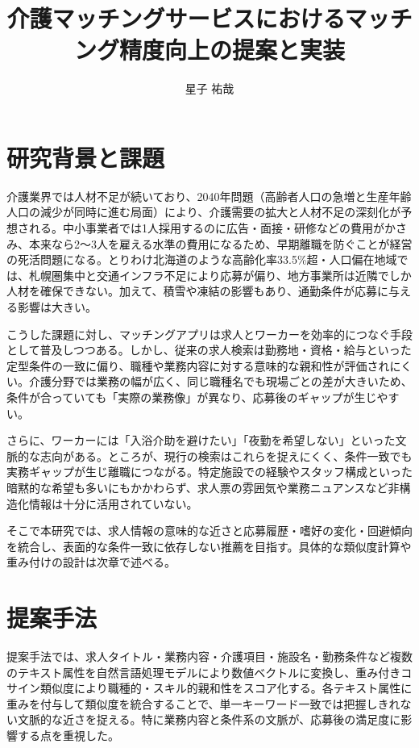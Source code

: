\documentclass[twocolumn,a4j,dvipdfmx]{jsarticle_customized1}
\title{介護マッチングサービスにおけるマッチング精度向上の提案と実装}
\author{星子 祐哉}
\date{}
\begin{document}
\twocolumn[\maketitle\vspace{0.0zw}]
\setlength{\baselineskip}{12.6pt}
\setlength{\columnsep}{8pt}
\setlength{\parindent}{1zw}

 \section{研究背景と課題}
介護業界では人材不足が続いており、2040年問題（高齢者人口の急増と生産年齢人口の減少が同時に進む局面）により、介護需要の拡大と人材不足の深刻化が予想される。中小事業者では1人採用するのに広告・面接・研修などの費用がかさみ、本来なら2〜3人を雇える水準の費用になるため、早期離職を防ぐことが経営の死活問題になる。とりわけ北海道のような高齢化率33.5\%超・人口偏在地域では、札幌圏集中と交通インフラ不足により応募が偏り、地方事業所は近隣でしか人材を確保できない。加えて、積雪や凍結の影響もあり、通勤条件が応募に与える影響は大きい。

こうした課題に対し、マッチングアプリは求人とワーカーを効率的につなぐ手段として普及しつつある。しかし、従来の求人検索は勤務地・資格・給与といった定型条件の一致に偏り、職種や業務内容に対する意味的な親和性が評価されにくい。介護分野では業務の幅が広く、同じ職種名でも現場ごとの差が大きいため、条件が合っていても「実際の業務像」が異なり、応募後のギャップが生じやすい。

さらに、ワーカーには「入浴介助を避けたい」「夜勤を希望しない」といった文脈的な志向がある。ところが、現行の検索はこれらを捉えにくく、条件一致でも実務ギャップが生じ離職につながる。特定施設での経験やスタッフ構成といった暗黙的な希望も多いにもかかわらず、求人票の雰囲気や業務ニュアンスなど非構造化情報は十分に活用されていない。

そこで本研究では、求人情報の意味的な近さと応募履歴・嗜好の変化・回避傾向を統合し、表面的な条件一致に依存しない推薦を目指す。具体的な類似度計算や重み付けの設計は次章で述べる。


\section{提案手法}
提案手法では、求人タイトル・業務内容・介護項目・施設名・勤務条件など複数のテキスト属性を自然言語処理モデルにより数値ベクトルに変換し、重み付きコサイン類似度により職種的・スキル的親和性をスコア化する。各テキスト属性に重みを付与して類似度を統合することで、単一キーワード一致では把握しきれない文脈的な近さを捉える。特に業務内容と条件系の文脈が、応募後の満足度に影響する点を重視した。
\end{document}
